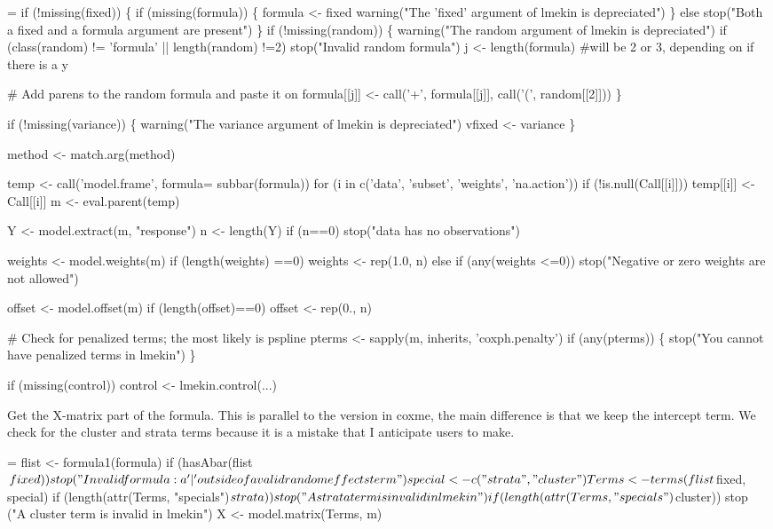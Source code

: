 \documentclass{article}
\begin{document}
\begin{nwchunk}
=
 if (!missing(fixed)) \{
     if (missing(formula)) \{
         formula <- fixed
         warning("The 'fixed' argument of lmekin is depreciated")
         \}
     else stop("Both a fixed and a formula argument are present")
     \}
 if (!missing(random)) \{
     warning("The random argument of lmekin is depreciated")
     if (class(random) != 'formula' || length(random) !=2) 
         stop("Invalid random formula")
     j <- length(formula)   #will be 2 or 3, depending on if there is a y
 
     # Add parens to the random formula and paste it on
     formula[[j]] <- call('+', formula[[j]], call('(', random[[2]]))  
     \}
 
 if (!missing(variance)) \{
     warning("The variance argument of lmekin is depreciated")
     vfixed <- variance
     \}
 
 method <- match.arg(method)
 
 temp <- call('model.frame', formula= subbar(formula))
 for (i in c('data', 'subset', 'weights', 'na.action'))
     if (!is.null(Call[[i]])) temp[[i]] <- Call[[i]]
 m <- eval.parent(temp)
 
 Y <- model.extract(m, "response")
 n <- length(Y)
 if (n==0) stop("data has no observations")
 
 weights <- model.weights(m)
 if (length(weights) ==0) weights <- rep(1.0, n)
 else if (any(weights <=0))
     stop("Negative or zero weights are not allowed")
 
 offset <- model.offset(m)
 if (length(offset)==0) offset <- rep(0., n)
 
 # Check for penalized terms; the most likely is pspline
 pterms <- sapply(m, inherits, 'coxph.penalty')
 if (any(pterms)) \{
     stop("You cannot have penalized terms in lmekin")
     \}
 
 if (missing(control)) control <- lmekin.control(...)
\end{nwchunk}

Get the X-matrix part of the formula.
This is parallel to the version in coxme, the main difference is
that we keep the intercept term.
We check for the cluster and strata terms because it is a mistake
that I anticipate users to make.
\begin{nwchunk}
=
 flist <- formula1(formula)
 if (hasAbar(flist$fixed))
     stop("Invalid formula: a '|' outside of a valid random effects term")
 
 special <- c("strata", "cluster")
 Terms <- terms(flist$fixed, special)
 if (length(attr(Terms, "specials")$strata))
     stop ("A strata term is invalid in lmekin")
 if (length(attr(Terms, "specials")$cluster))
     stop ("A cluster term is invalid in lmekin")
 X <- model.matrix(Terms, m)
\end{nwchunk}
    
\end{document}
